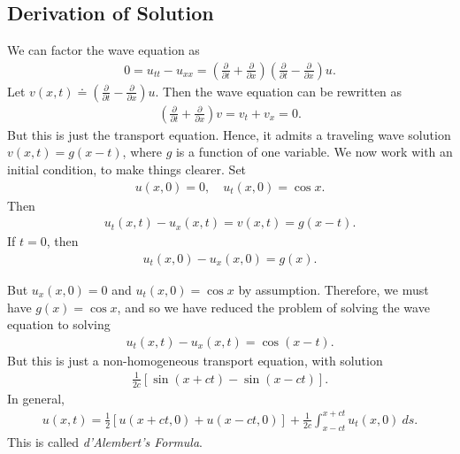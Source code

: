 \subsection{Derivation of Solution}
We can factor the wave equation as
\begin{equation*}
\begin{split}
	0 = u_{tt} - u_{xx} = \left( \frac{\partial}{\partial t} +
	\frac{\partial}{\partial x} \right)\left( \frac{\partial}{\partial t} -
	\frac{\partial}{\partial x} \right) u.
\end{split}
\end{equation*}
Let $v(x,t) \doteq \left( \frac{\partial}{\partial t} -
\frac{\partial}{\partial x} \right) u $. Then the wave equation can be rewritten
as
\begin{equation*}
\begin{split}
	\left( \frac{\partial}{\partial t} + \frac{\partial}{\partial x} \right) v
	= v_{t} + v_{x} = 0.
\end{split}
\end{equation*}
But this is just the transport equation. Hence, it admits a traveling wave
solution $v(x,t) = g(x-t)$, where $g$ is a function of one variable.
We now work with an initial condition, to make things clearer.
Set
\begin{equation*}
\begin{split}
	u(x,0) = 0, \quad u_{t}(x,0) = \cos x.
\end{split}
\end{equation*}
Then
\begin{equation*}
\begin{split}
	u_{t}(x,t) - u_{x}(x,t) = v(x,t) = g(x-t).
\end{split}
\end{equation*}
If $t=0$, then
\begin{equation*}
\begin{split}
	u_{t}(x,0) - u_{x}(x,0) = g(x).
\end{split}
\end{equation*}

But $u_{x}(x,0) = 0$ and $u_{t}(x,0) = \cos x$ by assumption. Therefore,
we must have $g(x) = \cos x$, and so we have reduced the problem of solving the
wave equation to solving
\begin{equation*}
\begin{split}
	u_{t}(x,t) - u_{x}(x,t) = \cos (x-t).
\end{split}
\end{equation*}
But this is just a non-homogeneous transport equation, with solution
\begin{equation*}
\begin{split}
\frac{1}{2c} \left[ \sin(x + ct) - \sin(x-ct) \right].
\end{split}
\end{equation*}
In general,
\begin{equation*}
\begin{split}
	u(x,t) = \frac{1}{2} \left[ u(x + ct, 0) + u(x-ct, 0) \right] +
\frac{1}{2c} \int_{x-ct}^{x+ct} u_{t}(x,0) \ ds.
\end{split}
\end{equation*}
This is called \emph{d'Alembert's Formula}.

